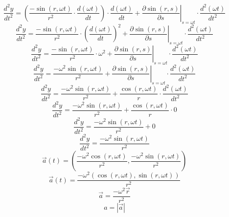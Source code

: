 \documentclass[a4paper,12pt]{report}
\begin{document}
\begin{equation}
\frac{d^2y}{dt^2} = \left(\frac{-\sin(r,\omega t)}{r^2} \cdot \frac{d (\omega t)}{dt}\right) \cdot \frac{d (\omega t)}{dt} + \left.\frac{\partial \sin(r,s)}{\partial s}\right|_{s = \omega t} \cdot \frac{d^2 (\omega t)}{dt^2}
\end{equation}
\begin{equation}
\frac{d^2y}{dt^2} = \frac{-\sin(r,\omega t)}{r^2} \cdot \left(\frac{d (\omega t)}{dt}\right)^2 + \left.\frac{\partial \sin(r,s)}{\partial s}\right|_{s = \omega t} \cdot \frac{d^2 (\omega t)}{dt^2}
\end{equation}
\begin{equation}
\frac{d^2y}{dt^2} = \frac{-\sin(r,\omega t)}{r^2} \cdot \omega^2 + \left.\frac{\partial \sin(r,s)}{\partial s}\right|_{s = \omega t} \cdot \frac{d^2 (\omega t)}{dt^2}
\end{equation}
\begin{equation}
\frac{d^2y}{dt^2} = \frac{-\omega^2 \sin(r,\omega t)}{r^2} + \left.\frac{\partial \sin(r,s)}{\partial s}\right|_{s = \omega t} \cdot \frac{d^2 (\omega t)}{dt^2}
\end{equation}
\begin{equation}
\frac{d^2y}{dt^2} = \frac{-\omega^2 \sin(r,\omega t)}{r^2} + \frac{\cos(r,\omega t)}{r} \cdot \frac{d^2 (\omega t)}{dt^2}
\end{equation}
\begin{equation}
\frac{d^2y}{dt^2} = \frac{-\omega^2 \sin(r,\omega t)}{r^2} + \frac{\cos(r,\omega t)}{r} \cdot 0
\end{equation}
\begin{equation}
\frac{d^2y}{dt^2} = \frac{-\omega^2 \sin(r,\omega t)}{r^2} + 0
\end{equation}
\begin{equation}
\frac{d^2y}{dt^2} = \frac{-\omega^2 \sin(r,\omega t)}{r^2}
\end{equation}
\begin{equation}
\vec{a}(t) = \left(\frac{-\omega^2 \cos(r,\omega t)}{r^2},\frac{-\omega^2 \sin(r,\omega t)}{r^2}\right)
\end{equation}
\begin{equation}
\vec{a}(t) = \frac{-\omega^2 \left(\cos(r,\omega t),\sin(r,\omega t)\right)}{r^2}
\end{equation}
\begin{equation}
\vec{a} = \frac{-\omega^2 \vec{r}}{r^2}
\end{equation}
\begin{equation}
a = \left|\vec{a}\right|
\end{equation}
\end{document}
